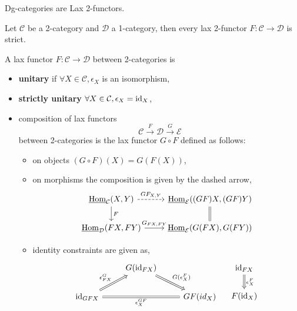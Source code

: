 \begin{rmk}
	Dg-categories are Lax 2-functors.
\end{rmk}	

\begin{Exercise}
	Let $ \mathcal{ C } $ be a 2-category and $ \mathcal{ D } $ a 1-category, then every lax 2-functor $ F \colon  \mathcal{ C } \to \mathcal{ D } $ is strict.
\end{Exercise}

\begin{defi}
	A lax functor $ F \colon \mathcal{ C } \to \mathcal{ D } $ between 2-categories is 
	\begin{itemize}
		\item 
		\textbf{unitary} if $  \forall X \in \mathcal{ C } , \epsilon_X $ is an isomorphism,
		
		\item 
		\textbf{strictly unitary} $ \forall X \in \mathcal{ C } , \epsilon_X = \operatorname{id}_X $,
		
		\item 
		composition of lax functors
		\[
			\mathcal{ C } \xrightarrow{ F } 
			\mathcal{ D } \xrightarrow{ G } 
			\mathcal{ E }
		\]  
		between 2-categories is the lax functor $ G \circ F $ defined as follows:
		
		\begin{itemize}
			\item 
			on objects $( G \circ F ) ( X ) = G ( F ( X ) )$,
			
			\item 
			on morphisms the composition is given by the dashed arrow,
			\[
			\begin{tikzcd}
				\underline{ \Hom }_{ \mathcal{ C } } ( X , Y )
				\ar[r, dashed, "GF_{ X , Y } "]
				\ar[d, " F "]
				&
				\underline{ \Hom }_{ \mathcal{ E } } ( ( G F ) X , ( G F ) Y )
				\ar[d, equal]
				\\
				\underline{ \Hom }_{ \mathcal{ D } } ( F X , F Y )
				\ar[r, "G_{ F X , F Y }"]
				&
				\underline{\Hom}_{\mathcal{ E } } ( G ( F X ), G ( F Y ) )   
			\end{tikzcd}
			\]
			
			\item 
			identity constraints are given as,
			\[
			\begin{tikzcd}
				&G ( \id_{ F X } )
				\ar[rd, Rightarrow, " G ( \epsilon_X^F) "]
				\\
				\id_{ G F X }
				\ar[ru, Rightarrow, " \epsilon_{ F X }^G"]
				\ar[rr, Rightarrow, equal, " \epsilon_X^{ G F }"']
				&&
				GF ( id_X )
			\end{tikzcd}
			\quad 
			\begin{tikzcd}		
				\id_{ F X }
				\ar[d, Rightarrow, "\epsilon_X^F"]
				\\
				F ( \id_X ) 
			\end{tikzcd}
			\]
			

\end{itemize}
\end{itemize}
\end{defi}
